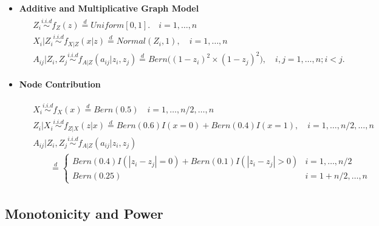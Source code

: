 \documentclass[12pt]{article}
\theoremstyle{definition}
\begin{document}
\begin{itemize}
\item \textbf{Additive and Multiplicative Graph Model}
\begin{equation}
	\label{eq:ame}
	\begin{gathered}
	\begin{aligned}
	&	Z_{i} \overset{i.i.d}{\sim} f_{Z}(z) \stackrel{d}{=} Uniform[0,1]. \quad i = 1, \ldots, n \\ 
	&	X_{i} | Z_{i} \overset{i.i.d}{\sim}  f_{X|Z}(x|z) \stackrel{d}{=}  Normal(Z_{i}, 1), \quad i= 1, \ldots, n \\
	&	A_{ij} | Z_{i}, Z_{j} \overset{i.i.d}{\sim}  f_{A|Z}(a_{ij} | z_{i}, z_{j}) \stackrel{d}{=}   Bern \big(  ( 1 - z_{i})^2 \times (1 - z_{j})^2    \big), \quad i,j = 1, \ldots, n; i < j.
	\end{aligned}
	\end{gathered}
\end{equation}	

\item \textbf{Node Contribution}

\begin{equation}
\begin{gathered}
\begin{aligned}
& X_{i} \overset{i.i.d}{\sim} f_{X}(x)   \stackrel{d}{=}  Bern(0.5)  \quad i = 1, \ldots ,n/2, \ldots, n \\ & Z_{i} | X_{i}  \overset{i.i.d}{\sim}    f_{Z|X}(z|x)  \stackrel{d}{=}   Bern(0.6) I(x = 0) + Bern(0.4) I(x=1), \quad  i = 1,\ldots,n/2, \ldots, n \\
& A_{ij} | Z_{i}, Z_{j}   \overset{i.i.d}{\sim}   f_{A|Z}(a_{ij} | z_{i}, z_{j})  \\ & \quad  \quad \stackrel{d}{=} \left\{  \begin{array}{cc} Bern(0.4) I(|z_{i} - z_{j}| = 0)  + Bern(0.1) I(|z_{i} - z_{j}| > 0) & i = 1,\ldots,n/2 \\   Bern(0.25)  & i=1+n/2, \ldots, n  \end{array} \right.
\end{aligned}
\end{gathered}
\label{eq:contri}
\end{equation}

\end{itemize}
\subsection{Monotonicity and Power}
\end{document}
